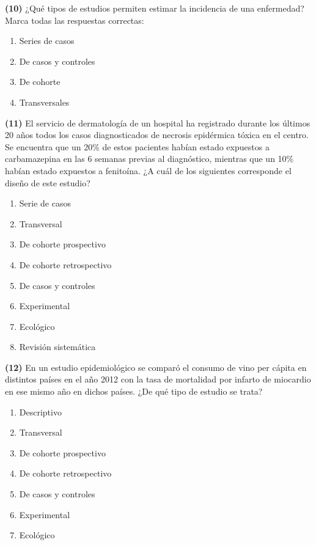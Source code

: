 \documentclass[
]{book}
\providecommand{\tightlist}{%
  \setlength{\itemsep}{0pt}\setlength{\parskip}{0pt}}
\theoremstyle{definition}
\theoremstyle{definition}
\theoremstyle{definition}
\theoremstyle{definition}
\theoremstyle{remark}
\begin{document}
\textbf{(10)} ¿Qué tipos de estudios permiten estimar la incidencia de una enfermedad? Marca todas las respuestas correctas:

\begin{enumerate}
\def\labelenumi{\arabic{enumi}.}
\tightlist
\item
  Series de casos
\item
  De casos y controles
\item
  De cohorte\\
\item
  Transversales
\end{enumerate}

\textbf{(11)} El servicio de dermatología de un hospital ha registrado durante los últimos 20 años todos los casos diagnosticados de necrosis epidérmica tóxica en el centro. Se encuentra que un 20\% de estos pacientes habían estado expuestos a carbamazepina en las 6 semanas previas al diagnóstico, mientras que un 10\% habían estado expuestos a fenitoína. ¿A cuál de los siguientes corresponde el diseño de este estudio?

\begin{enumerate}
\def\labelenumi{\arabic{enumi}.}
\tightlist
\item
  Serie de casos
\item
  Transversal
\item
  De cohorte prospectivo
\item
  De cohorte retrospectivo
\item
  De casos y controles
\item
  Experimental
\item
  Ecológico
\item
  Revisión sistemática
\end{enumerate}

\textbf{(12)} En un estudio epidemiológico se comparó el consumo de vino per cápita en distintos países en el año 2012 con la tasa de mortalidad por infarto de miocardio en ese mismo año en dichos países. ¿De qué tipo de estudio se trata?

\begin{enumerate}
\def\labelenumi{\arabic{enumi}.}
\tightlist
\item
  Descriptivo
\item
  Transversal
\item
  De cohorte prospectivo
\item
  De cohorte retrospectivo
\item
  De casos y controles
\item
  Experimental
\item
  Ecológico
\end{enumerate}
\end{document}
